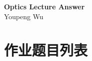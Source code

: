 \documentclass[a4paper]{article}
\newcommand{\TITLE}{Optics Lecture Answer}
\newcommand{\AUTHOR}{Youpeng Wu}
\begin{document}
\HEADPAGE

\begin{center}
        \Large\textbf{\TITLE}\\
        \vspace*{3mm}
        \normalsize
        \AUTHOR
\end{center}
\vspace*{5mm}
\begin{abstract}
        This is a unofficial answer for optics lecture in PKU 2025 autumn. This is only for learning and communication. If you have any question, please contact me.
\end{abstract}

\tableofcontents
\newpage
\section{作业题目列表}
\end{document}
